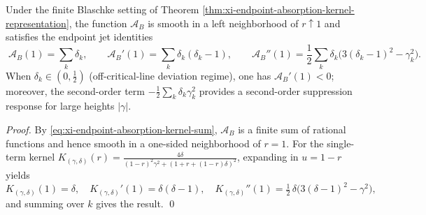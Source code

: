 \begin{theorem}[Endpoint Jet Invariants: Low-Order Derivatives of \texorpdfstring{$\mathcal{A}_B$}{A\_B} at \texorpdfstring{$r=1$}{r=1} Yield Verifiable ``Moments'']\label{thm:xi-endpoint-absorption-jet-moments}
Under the finite Blaschke setting of Theorem \ref{thm:xi-endpoint-absorption-kernel-representation}, the function \(\mathcal{A}_B\) is smooth in a left neighborhood of \(r\uparrow 1\) and satisfies the endpoint jet identities
\[
\boxed{\;
\mathcal{A}_B(1)=\sum_{k}\delta_k,\qquad
\mathcal{A}_B'(1)=\sum_{k}\delta_k(\delta_k-1),\qquad
\mathcal{A}_B''(1)=\frac12\sum_{k}\delta_k\bigl(3(\delta_k-1)^2-\gamma_k^2\bigr).\;}
\]
When \(\delta_k\in(0,\tfrac12)\) (off-critical-line deviation regime), one has \(\mathcal{A}_B'(1)<0\); moreover, the second-order term
\(-\tfrac12\sum_k\delta_k\gamma_k^2\)
provides a second-order suppression response for large heights \(|\gamma|\).
\end{theorem}

\begin{proof}
By \eqref{eq:xi-endpoint-absorption-kernel-sum}, \(\mathcal{A}_B\) is a finite sum of rational functions and hence smooth in a one-sided neighborhood of \(r=1\).
For the single-term kernel
\(
K_{(\gamma,\delta)}(r)=\frac{4\delta}{(1-r)^2\gamma^2+(1+r+(1-r)\delta)^2}
\),
expanding in \(u=1-r\) yields
\[
K_{(\gamma,\delta)}(1)=\delta,\quad
K_{(\gamma,\delta)}'(1)=\delta(\delta-1),\quad
K_{(\gamma,\delta)}''(1)=\tfrac12\,\delta\bigl(3(\delta-1)^2-\gamma^2\bigr),
\]
and summing over \(k\) gives the result. \qed
\end{proof}

